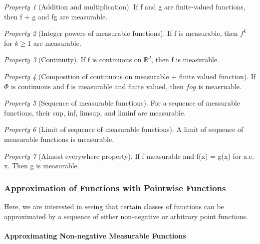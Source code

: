 \documentclass[class=article, crop=false]{standalone}
\theoremstyle{definition}
\theoremstyle{remark}
\theoremstyle{lemma}
\theoremstyle{theorem}
\theoremstyle{corollary}
\theoremstyle{property}
\newtheorem*{property}{Property}
\begin{document}
			\begin{property}[Addition and multiplication]
				If f and g are finite-valued functions, then f + g and fg are measurable.
			\end{property}

			\begin{property}[Integer powers of measurable functions]
				If f is measurable, then $f^k$ for $k \ge 1$ are measurable.
			\end{property}

			\begin{property}[Continuity]
				If f is continuous on $\mathbb{R}^d$, then f is measurable. 
			\end{property}

			\begin{property}[Composition of continuous on measurable + finite valued function]
				If $\Phi$ is continuous and f is measurable and finite valued, then $f o g$ is measruable.
			\end{property}

			\begin{property}[Sequence of measurable functions]
				For a sequence of measurable functions, their sup, inf, limsup, and liminf are measurable.
			\end{property}

			\begin{property}[Limit of sequence of measurable functions]
				A limit of sequence of measurable functions is measurable.
			\end{property}

			\begin{property}[Almost everywhere property]
				If f measurable and f(x) = g(x) for a.e. x. Then g is measurable.
			\end{property}


		\subsubsection{Approximation of Functions with Pointwise Functions}
			Here, we are interested in seeing that certain classes of functions can be approximated by a sequence of either non-negative or arbitrary point functions.

			\paragraph{Approximating Non-negative Measurable Functions}
\end{document}
